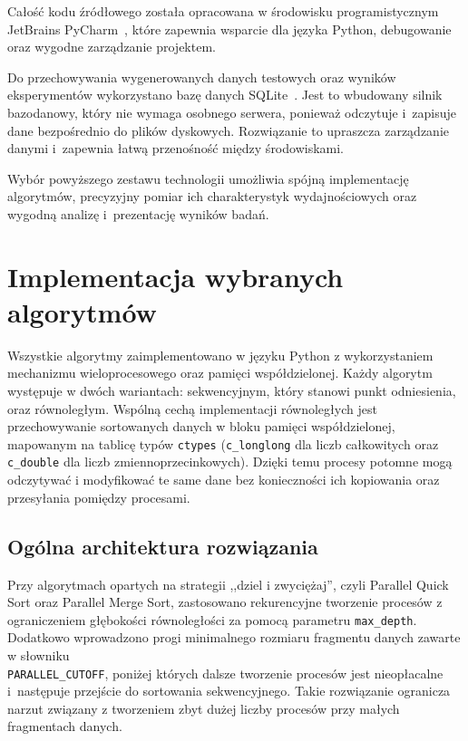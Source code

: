 Całość kodu źródłowego została opracowana w środowisku programistycznym JetBrains PyCharm~\cite{bib:PyCharm}, 
które zapewnia wsparcie dla języka Python, debugowanie oraz wygodne zarządzanie projektem.

Do przechowywania wygenerowanych danych testowych oraz wyników eksperymentów wykorzystano bazę danych SQLite~\cite{bib:SQLite}. 
Jest to wbudowany silnik bazodanowy, który nie wymaga osobnego serwera, ponieważ odczytuje i~zapisuje dane bezpośrednio do plików dyskowych. 
Rozwiązanie to upraszcza zarządzanie danymi i~zapewnia łatwą przenośność między środowiskami.

Wybór powyższego zestawu technologii umożliwia spójną implementację algorytmów, precyzyjny pomiar ich charakterystyk wydajnościowych 
oraz wygodną analizę i~prezentację wyników badań.

\section{Implementacja wybranych algorytmów}
\label{sec:ImplementacjaAlgorytmow}

Wszystkie algorytmy zaimplementowano w języku Python z wykorzystaniem mechanizmu wieloprocesowego oraz pamięci współdzielonej. 
Każdy algorytm występuje w dwóch wariantach: sekwencyjnym, który stanowi punkt odniesienia, oraz równoległym. 
Wspólną cechą implementacji równoległych jest przechowywanie sortowanych danych w bloku pamięci współdzielonej, 
mapowanym na tablicę typów \texttt{ctypes} (\texttt{c\_longlong} dla liczb całkowitych oraz \texttt{c\_double} dla liczb zmiennoprzecinkowych). 
Dzięki temu procesy potomne mogą odczytywać i modyfikować te same dane bez konieczności ich kopiowania oraz przesyłania pomiędzy procesami.

\subsection*{Ogólna architektura rozwiązania}

Przy algorytmach opartych na strategii ,,dziel i zwyciężaj'', czyli Parallel Quick Sort oraz Parallel Merge Sort, 
zastosowano rekurencyjne tworzenie procesów z ograniczeniem głębokości równoległości za pomocą parametru \texttt{max\_depth}. 
Dodatkowo wprowadzono progi minimalnego rozmiaru fragmentu danych zawarte w słowniku\\ \texttt{PARALLEL\_CUTOFF}, 
poniżej których dalsze tworzenie procesów jest nieopłacalne i~następuje przejście do sortowania sekwencyjnego. 
Takie rozwiązanie ogranicza narzut związany z tworzeniem zbyt dużej liczby procesów przy małych fragmentach danych.

